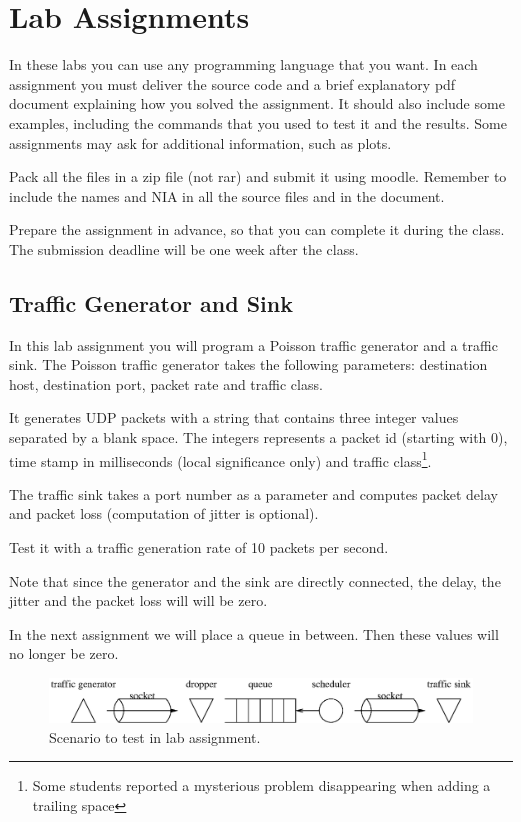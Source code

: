 \chapter{Lab Assignments}

In these labs you can use any programming language that you want. 
In each assignment you must deliver the source code and a brief explanatory pdf document explaining how you solved the assignment.
It should also include some examples, including the commands that you used to test it and the results.
Some assignments may ask for additional information, such as plots.

Pack all the files in a zip file (not rar) and submit it using moodle.
Remember to include the names and NIA in all the source files and in the document.

Prepare the assignment in advance, so that you can complete it during the class.
The submission deadline will be one week after the class.

\section{Traffic Generator and Sink}

In this lab assignment you will program a Poisson traffic generator and a traffic sink.
The Poisson traffic generator takes the following parameters:
destination host, destination port, packet rate and traffic class.

It generates UDP packets with a string that contains three integer values separated by a blank space. The integers represents a packet id (starting with 0), time stamp in milliseconds (local significance only) and traffic class\footnote{Some students reported a mysterious problem disappearing when adding a trailing space}.

The traffic sink takes a port number as a parameter and computes packet delay and packet loss (computation of jitter is optional).

Test it with a traffic generation rate of 10 packets per second.

Note that since the generator and the sink are directly connected, the delay, the jitter and the packet loss will will be zero.

In the next assignment we will place a queue in between.
Then these values will no longer be zero.

\begin{figure}[!h]
\centering
\includegraphics[width=\linewidth]{figures/scenario.eps}
\caption{Scenario to test in lab assignment.}
\label{fig:scenario}
\end{figure}

